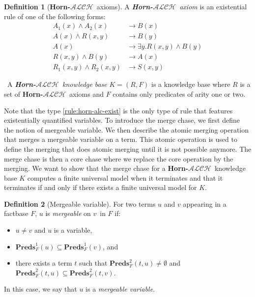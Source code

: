 \documentclass{article}
\theoremstyle{definition}
\newtheorem{definition}{Definition}[section]
\theoremstyle{remark}
\newcommand{\Preds}{\textbf{Preds}}
\newcommand{\ALCH}{\textbf{Horn-$\mathcal{ALCH}$}}
\begin{document}
\begin{definition}[\ALCH\ axioms]
A \emph{\ALCH\ axiom} is an existential rule of one of the following forms:
\begin{align}
A_1(x) \wedge A_2(x) &\rightarrow B(x) \\
A(x) \wedge R(x,y) &\rightarrow B(y) \\
A(x) &\rightarrow \exists y.R(x,y) \wedge B(y) \label{rule:horn-alc-exist} \\
R(x,y) \wedge B(y) &\rightarrow A(x) \\
R_1(x,y) \wedge R_2(x,y) &\rightarrow S(x,y)
\end{align}


\
A \emph{\ALCH\ knowledge base} $K = (R,F)$ is a knowledge base where $R$ is a set of \ALCH\ axioms and $F$ contains only predicates of arity one or two. 

\end{definition}

Note that the type \ref{rule:horn-alc-exist} is the only type of rule that features existentially quantified variables. To introduce the merge chase, we first define the notion of mergeable variable. We then describe the atomic merging operation that merges a mergeable variable on a term. This atomic operation is used to define the merging that does atomic merging until it is not possible anymore. The merge chase is then a core chase where we replace the core operation by the merging. We want to show that the merge chase for a \ALCH\ knowledge base $K$ computes a finite universal model when it terminates and that it terminates if and only if there exists a finite universal model for $K$. 

\begin{definition}[Mergeable variable]
For two terms $u$ and $v$ appearing in a factbase $F$, $u$ is \emph{mergeable} on $v$\ in $F$ if:
\begin{itemize}
\item $u \neq v$ and $u$ is a variable,
\item $\Preds_{F}^1(u) \subseteq \Preds_{F}^1(v)$, and
\item there exists a term $t$ such that $\Preds^2_{F}(t,u) \neq \emptyset$ and $\Preds_{F}^2(t,u) \subseteq \Preds_{F}^2(t,v)$.
\end{itemize}
In this case, we say that $u$ is a \emph{mergeable variable}.
\end{definition}
\end{document}
